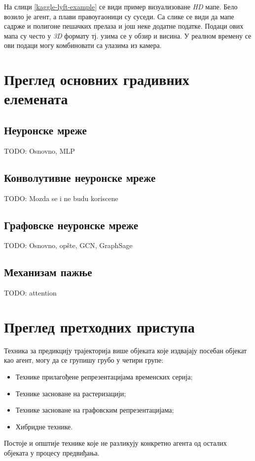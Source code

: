 \documentclass[11pt,oneside]{memoir}
\begin{document}
На слици \ref{kaggle-lyft-example} се види пример визуализоване \textit{HD} мапе. Бело возило је агент, а плави правоугаоници су суседи. 
Са слике се види да мапе садрже и полигоне пешачких прелаза и још неке додатне податке. Подаци ових мапа су често у \textit{3D} формату
тј. узима се у обзир и висина. У реалном времену се ови подаци могу комбиновати са улазима из камера. 

\chapter{Преглед основних градивних елемената}
\label{chp:razrada}

\section{Неуронске мреже}

TODO: Osnovno, MLP

\section{Конволутивне неуронске мреже}

TODO: Mozda se i ne budu koriscene

\section{Графовске неуронске мреже}

TODO: Osnovno, opšte, GCN, GraphSage

\section{Механизам пажње}

TODO: attention

\chapter{Преглед претходних приступа}
\label{chp:razrada}

Техника за предикцију трајекторија више објеката које издвајају посебан објекат као агент, могу да се групишу грубо у четири групе:
\begin{itemize}
  \item Технике прилагођене репрезентацијама временских серија;
  \item Технике засноване на растеризацији;
  \item Технике засноване на графовским репрезентацијама;
  \item Хибридне технике.
\end{itemize}
Постоје и општије технике које не разликују конкретно агента од осталих објеката у процесу предвиђања.
\end{document}
